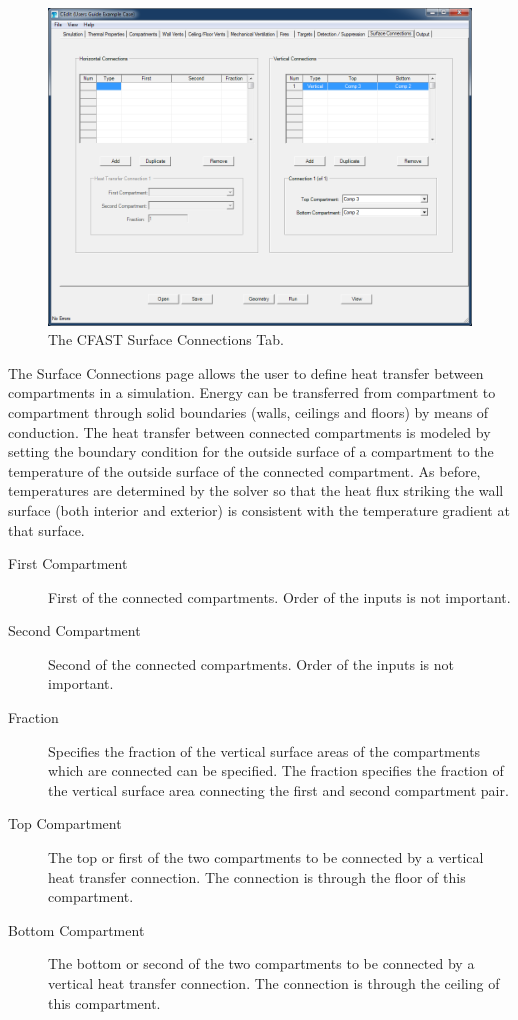 \begin{figure}[h!]
\begin{center}
\includegraphics[width=6.5in]{FIGURES/Surface_Connection_Tab}
\caption[The CFAST Surface Connections Tab]{The CFAST Surface Connections Tab.}
\end{center}
\end{figure}

The Surface Connections page allows the user to define heat transfer between compartments in a simulation. Energy can be transferred from compartment to compartment through solid boundaries (walls, ceilings and floors) by means of conduction. The heat transfer between connected compartments is modeled by setting the boundary condition for the outside surface of a compartment to the temperature of the outside surface of the  connected compartment.   As before, temperatures are determined by the solver so that the heat flux striking the wall surface (both interior and exterior) is consistent with the temperature gradient at that surface.

\begin{description}
\item[First Compartment] First of the connected compartments. Order of the inputs is not important.

\item[Second Compartment] Second of the connected compartments. Order of the inputs is not important.

\item[Fraction] Specifies the fraction of the vertical surface areas of the compartments which are connected can be specified. The fraction specifies the fraction of the vertical surface area connecting the first and second compartment pair.

\item[Top Compartment] The top or first of the two compartments to be connected by a vertical heat transfer connection. The connection is through the floor of this compartment.

\item[Bottom Compartment] The bottom or second of the two compartments to be connected by a vertical heat transfer connection. The connection is through the ceiling of this compartment.
\end{description}


